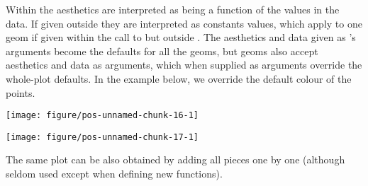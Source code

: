 \documentclass[paper=a4,10pt,div=17,headsepline,BCOR=12mm,twoside,open=right]{scrbook}\usepackage{knitr}
\begin{document}
Within  the aesthetics are interpreted as being a function of the values in the data. If given outside  they are interpreted as constants values, which apply to one geom if given within the call to  but outside . The aesthetics and data given as 's arguments become the defaults for all the geoms, but geoms also accept aesthetics and data as arguments, which when supplied as arguments override the whole-plot defaults. In the example below, we override the default colour of the points.

\begin{knitrout}\footnotesize
{}\color{fgcolor}\begin{kframe}
\begin{alltt}
\hlstd{(} 
       \hlstd{(} \hlstd{=}    \hlopt{/}  \hlopt{+}
  \hlstd{(} \hlstd{=} \hlstd{)}
\end{alltt}
\end{kframe}

{\centering \texttt{[image: figure/pos-unnamed-chunk-16-1]} 

}



\end{knitrout}

\begin{knitrout}\footnotesize
{}\color{fgcolor}\begin{kframe}
\begin{alltt}
\hlstd{(} 
       \hlstd{(} \hlstd{=}    \hlopt{/}   \hlstd{=}  \hlopt{+}
  \hlstd{()}
\end{alltt}
\end{kframe}

{\centering \texttt{[image: figure/pos-unnamed-chunk-17-1]} 

}



\end{knitrout}

The same plot can be also obtained by adding all pieces one by one (although
seldom used except when defining new functions).
\end{document}
